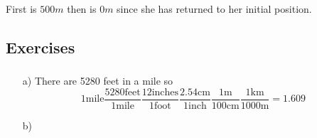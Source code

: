\documentclass[%
 reprint,
superscriptaddress,
 amsmath,amssymb,
 aps,
prc,
]{revtex4-1}
\begin{document}
\subsubsection{}
First is $500m$ then is $0m$ since she has returned to her initial position.

\subsubsection{}

\subsection{Exercises}
\subsubsection{}
\begin{enumerate}
\item[a)] There are 5280 feet in a mile so
\begin{equation*}
1\text{mile}\dfrac{5280\text{feet}}{1\text{mile}}\dfrac{12\text{inches}}{1\text{foot}}\dfrac{2.54\text{cm}}{1\text{inch}}\dfrac{1\text{m}}{100\text{cm}}\dfrac{1\text{km}}{1000\text{m}}=1.609
\end{equation*} 
\item[b)]
\end{enumerate}
\end{document}

